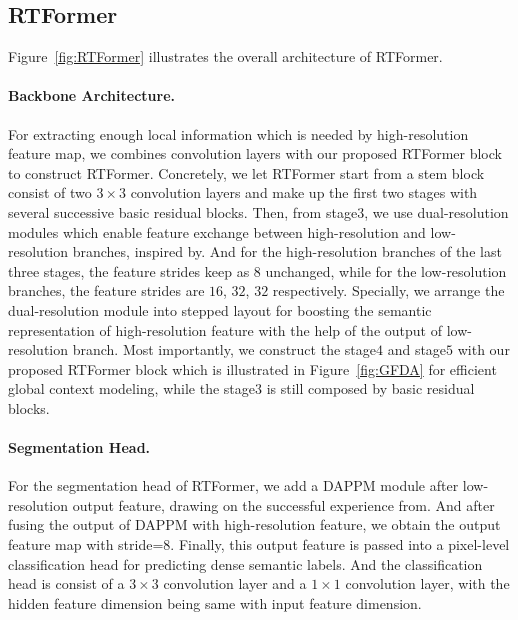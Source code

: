 \documentclass{article}
\begin{document}
\subsection{RTFormer}

Figure~\ref{fig:RTFormer} illustrates the overall architecture of RTFormer.

\vspace{-2mm}
\paragraph{Backbone Architecture.}
For extracting enough local information which is needed by high-resolution feature map, we combines convolution layers with our proposed RTFormer block to construct RTFormer. Concretely, we let RTFormer start from a stem block consist of two $3\times 3$ convolution layers and make up the first two stages with several successive basic residual blocks\cite{he2016deep}. Then, from stage$3$, we use dual-resolution modules which enable feature exchange between high-resolution and low-resolution branches, inspired by\cite{hong2021deep}. And for the high-resolution branches of the last three stages, the feature strides keep as $8$ unchanged, while for the low-resolution branches, the feature strides are $16$, $32$, $32$ respectively. Specially, we arrange the dual-resolution module into stepped layout for boosting the semantic representation of high-resolution feature with the help of the output of low-resolution branch. Most importantly, we construct the stage$4$ and stage$5$ with our proposed RTFormer block which is illustrated in Figure~\ref{fig:GFDA} for efficient global context modeling, while the stage$3$ is still composed by basic residual blocks.

\vspace{-2mm}
\paragraph{Segmentation Head.}
For the segmentation head of RTFormer, we add a DAPPM module after low-resolution output feature, drawing on the successful experience from\cite{hong2021deep}. And after fusing the output of DAPPM with high-resolution feature, we obtain the output feature map with stride=$8$. Finally, this output feature is passed into a pixel-level classification head for predicting dense semantic labels. And the classification head is consist of a $3\times 3$ convolution layer and a $1\times 1$ convolution layer, with the hidden feature dimension being same with input feature dimension.
\end{document}

